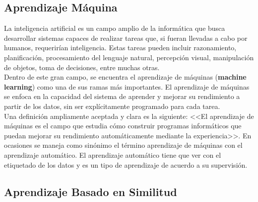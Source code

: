 \documentclass[12pt]{article}
\begin{document}
\subsection{Aprendizaje Máquina}
La inteligencia artificial es un campo amplio de la informática que busca desarrollar sistemas capaces de realizar tareas que, si fueran llevadas a cabo por humanos, requerirían inteligencia. Estas tareas pueden incluir razonamiento, planificación, procesamiento del lenguaje natural, percepción visual, manipulación de objetos, toma de decisiones, entre muchas otras.
\\
Dentro de este gran campo, se encuentra el aprendizaje de máquinas (\textbf{machine learning}) como una de sus ramas más importantes. El aprendizaje de máquinas se enfoca en la capacidad del sistema de aprender y mejorar su rendimiento a partir de los datos, sin ser explícitamente programado para cada tarea.
\\
Una definición ampliamente aceptada y clara es la siguiente: <<El aprendizaje de máquinas es el campo que estudia cómo construir programas informáticos que puedan mejorar su rendimiento automáticamente mediante la experiencia>>. En ocasiones se maneja como sinónimo el término aprendizaje de máquinas con el aprendizaje automático. El aprendizaje automático tiene que ver con el etiquetado de los datos y es un tipo de aprendizaje de acuerdo a su supervisión.

\cite{De0a100enIA_2}

\subsection{Aprendizaje Basado en Similitud}
\end{document}
